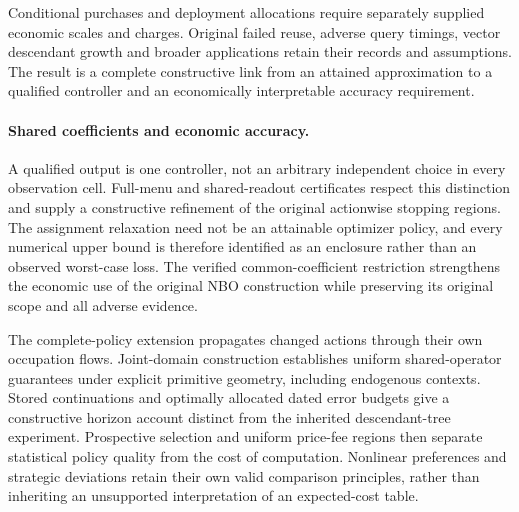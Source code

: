 \documentclass[ecta,nameyear,draft]{econsocart}
\begin{document}
Conditional purchases and deployment allocations require separately supplied economic scales and charges. Original failed reuse, adverse query timings, vector descendant growth and broader applications retain their records and assumptions. The result is a complete constructive link from an attained approximation to a qualified controller and an economically interpretable accuracy requirement.

\paragraph{Shared coefficients and economic accuracy.}
A qualified output is one controller, not an arbitrary independent choice in every observation cell. Full-menu and shared-readout certificates respect this distinction and supply a constructive refinement of the original actionwise stopping regions. The assignment relaxation need not be an attainable optimizer policy, and every numerical upper bound is therefore identified as an enclosure rather than an observed worst-case loss. The verified common-coefficient restriction strengthens the economic use of the original NBO construction while preserving its original scope and all adverse evidence.

The complete-policy extension propagates changed actions through their own occupation flows. Joint-domain construction establishes uniform shared-operator guarantees under explicit primitive geometry, including endogenous contexts. Stored continuations and optimally allocated dated error budgets give a constructive horizon account distinct from the inherited descendant-tree experiment. Prospective selection and uniform price-fee regions then separate statistical policy quality from the cost of computation. Nonlinear preferences and strategic deviations retain their own valid comparison principles, rather than inheriting an unsupported interpretation of an expected-cost table.



\end{document}
